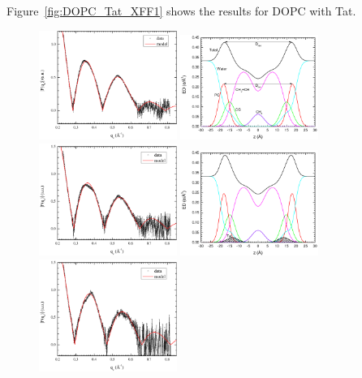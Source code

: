 Figure~\ref{fig:DOPC_Tat_XFF1} shows the results for DOPC with Tat. 
\begin{figure}[htbp]
  \centering
  \includegraphics[width=0.4\textwidth]{figures/Tat/SDP_Results/XFF/DOPC_XFF1}
  \includegraphics[width=0.4\textwidth]{figures/Tat/SDP_Results/EDP/DOPC_EDP1}
  \includegraphics[width=0.4\textwidth]{figures/Tat/SDP_Results/XFF/DOPC_Tat_62to1_3p0_XFF1}
  \includegraphics[width=0.4\textwidth]{figures/Tat/SDP_Results/EDP/DOPC_Tat_62to1_3p0_EDP1}
  \includegraphics[width=0.4\textwidth]{figures/Tat/SDP_Results/XFF/DOPC_Tat_28to1_3p0_XFF1}

\end{figure}
